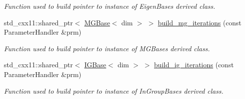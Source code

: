 \begin{DoxyCompactItemize}
\begin{DoxyCompactList}\small\item\em Function used to build pointer to instance of Eigen\+Base\textquotesingle{}s derived class. \end{DoxyCompactList}\item 
std\+\_\+cxx11\+::shared\+\_\+ptr$<$ \hyperlink{class_m_g_base}{M\+G\+Base}$<$ dim $>$ $>$ \hyperlink{class_bart_driver_af0c96d5fe57cdb8df75e1fb93ce6196b}{build\+\_\+mg\+\_\+iterations} (const Parameter\+Handler \&prm)
\begin{DoxyCompactList}\small\item\em Function used to build pointer to instance of M\+G\+Base\textquotesingle{}s derived class. \end{DoxyCompactList}\item 
std\+\_\+cxx11\+::shared\+\_\+ptr$<$ \hyperlink{class_i_g_base}{I\+G\+Base}$<$ dim $>$ $>$ \hyperlink{class_bart_driver_adc7ebcc2b3d02b7058410abef7e1b8a5}{build\+\_\+ig\+\_\+iterations} (const Parameter\+Handler \&prm)
\begin{DoxyCompactList}\small\item\em Function used to build pointer to instance of In\+Group\+Base\textquotesingle{}s derived class. \end{DoxyCompactList}\end{DoxyCompactItemize}
